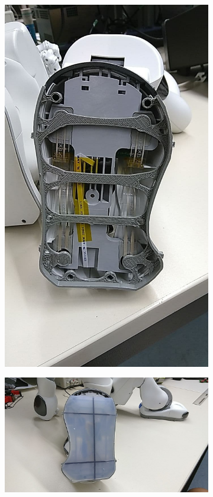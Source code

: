 \begin{figure}[tb]
	\hfill
	\begin{subfigure}[c]{0.3\linewidth}
		\centering
		\includegraphics[width=\linewidth]{Bilder/Schuh_an_NAO_ohne_Sohle.jpg}
	\end{subfigure}
	\hfill
	\begin{subfigure}[c]{0.6\linewidth}
		\centering
		\includegraphics[width=\linewidth]{Bilder/Schuh_an_NAO_mit_Sohle.jpg}

\end{subfigure}
\end{figure}
